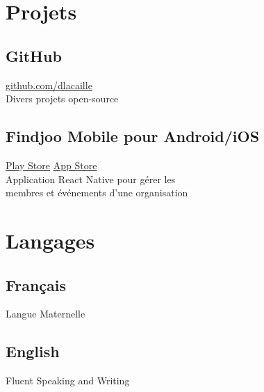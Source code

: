 \documentclass{article}
\begin{document}
\begin{paracol}{2}
\begin{leftcolumn}
    \section{Projets}

    \subsection{GitHub}
    \href{https://github.com/dlacaille}{\faGithub\hspace{0.5em}github.com/dlacaille}\\
    Divers projets open-source

    \vspace{0.5em}

    \subsection{Findjoo Mobile pour Android/iOS}
    \href{https://play.google.com/store/apps/details?id=com.findjoomobile}{\faGooglePlay\hspace{0.5em}Play Store}\hspace{1em}
    \href{https://apps.apple.com/us/app/findjoo/id1499583717}{\faAppStore\hspace{0.5em}App Store}\\
    Application React Native pour gérer les \\
    membres et événements d'une organisation

    \section{Langages}

    \subsection{Français}
    Langue Maternelle

    \vspace{0.5em}

    \subsection{English}
    Fluent Speaking and Writing


\end{leftcolumn}
\end{paracol}
\end{document}
